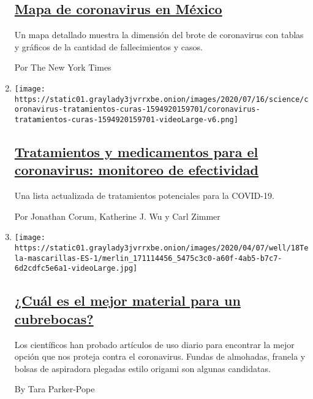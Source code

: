 \begin{enumerate}
  \hypertarget{mapa-de-coronavirus-en-muxe9xico}{%
  \subsection{\texorpdfstring{\href{/es/interactive/2020/espanol/america-latina/coronavirus-en-mexico.html}{Mapa
  de coronavirus en
  México}}{Mapa de coronavirus en México}}\label{mapa-de-coronavirus-en-muxe9xico}}

  Un mapa detallado muestra la dimensión del brote de coronavirus con
  tablas y gráficos de la cantidad de fallecimientos y casos.

  Por The New York Times
\item
  \texttt{[image: https://static01.graylady3jvrrxbe.onion/images/2020/07/16/science/coronavirus-tratamientos-curas-1594920159701/coronavirus-tratamientos-curas-1594920159701-videoLarge-v6.png]}

  \hypertarget{tratamientos-y-medicamentos-para-el-coronavirus-monitoreo-de-efectividad}{%
  \subsection{\texorpdfstring{\href{/es/interactive/2020/science/coronavirus-tratamientos-curas.html}{Tratamientos
  y medicamentos para el coronavirus: monitoreo de
  efectividad}}{Tratamientos y medicamentos para el coronavirus: monitoreo de efectividad}}\label{tratamientos-y-medicamentos-para-el-coronavirus-monitoreo-de-efectividad}}

  Una lista actualizada de tratamientos potenciales para la COVID-19.

  Por Jonathan Corum, Katherine J. Wu y Carl Zimmer
\item
  \texttt{[image: https://static01.graylady3jvrrxbe.onion/images/2020/04/07/well/18Tela-mascarillas-ES-1/merlin\_171114456\_5475c3c0-a60f-4ab5-b7c7-6d2cdfc5e6a1-videoLarge.jpg]}

  \hypertarget{cuuxe1l-es-el-mejor-material-para-un-cubrebocas}{%
  \subsection{\texorpdfstring{\href{/es/2020/04/18/espanol/material-mascarillas-virus.html}{¿Cuál
  es el mejor material para un
  cubrebocas?}}{¿Cuál es el mejor material para un cubrebocas?}}\label{cuuxe1l-es-el-mejor-material-para-un-cubrebocas}}

  Los científicos han probado artículos de uso diario para encontrar la
  mejor opción que nos proteja contra el coronavirus. Fundas de
  almohadas, franela y bolsas de aspiradora plegadas estilo origami son
  algunas candidatas.

  By Tara Parker-Pope
\end{enumerate}

